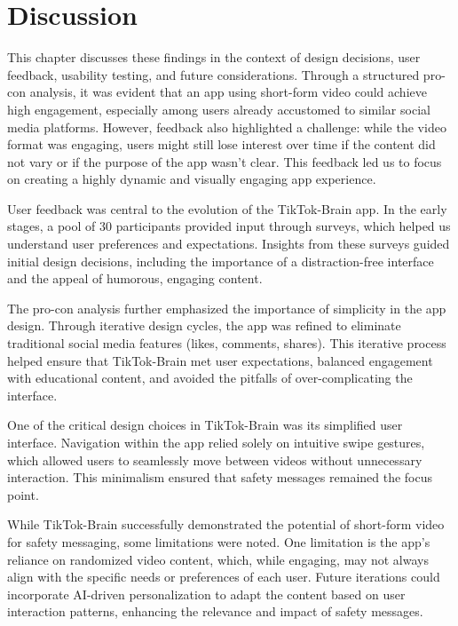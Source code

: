 \documentclass{article}
\begin{document}
\section{Discussion}

This chapter discusses these findings in the context of design decisions,
user feedback, usability testing, and future considerations.
Through a structured pro-con analysis, it was evident that an app using short-form video could achieve high engagement,
especially among users already accustomed to similar social media platforms.
However, feedback also highlighted a challenge: while the video format was engaging,
users might still lose interest over time if the content did not vary or if the purpose of the app wasn’t clear.
This feedback led us to focus on creating a highly dynamic and visually engaging app experience.

User feedback was central to the evolution of the TikTok-Brain app.
In the early stages, a pool of 30 participants provided input through surveys,
which helped us understand user preferences and expectations.
Insights from these surveys guided initial design decisions,
including the importance of a distraction-free interface and the appeal of humorous, engaging content.

The pro-con analysis further emphasized the importance of simplicity in the app design.
Through iterative design cycles, the app was refined to eliminate traditional social media features (likes, comments, shares).
This iterative process helped ensure that TikTok-Brain met user expectations,
balanced engagement with educational content, and avoided the pitfalls of over-complicating the interface.

One of the critical design choices in TikTok-Brain was its simplified user interface.
Navigation within the app relied solely on intuitive swipe gestures,
which allowed users to seamlessly move between videos without unnecessary interaction.
This minimalism ensured that safety messages remained the focus point.

While TikTok-Brain successfully demonstrated the potential of short-form video for safety messaging, some limitations were noted.
One limitation is the app’s reliance on randomized video content, which, while engaging,
may not always align with the specific needs or preferences of each user.
Future iterations could incorporate AI-driven personalization to adapt the content based on user interaction patterns,
enhancing the relevance and impact of safety messages.
\end{document}
